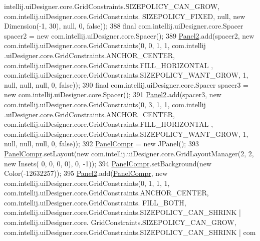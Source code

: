 \begin{DoxyCode}
      intellij.uiDesigner.core.GridConstraints.SIZEPOLICY\_CAN\_GROW, com.intellij.uiDesigner.core.GridConstraints.
      SIZEPOLICY\_FIXED, null, \textcolor{keyword}{new} Dimension(-1, 30), null, 0, \textcolor{keyword}{false}));
388         \textcolor{keyword}{final} com.intellij.uiDesigner.core.Spacer spacer2 = \textcolor{keyword}{new} com.intellij.uiDesigner.core.Spacer();
389         \hyperlink{classpresentacion_1_1form_1_1mainForm_a40e87b5e341114287b070012a4aadc8f}{Panel2}.add(spacer2, \textcolor{keyword}{new} com.intellij.uiDesigner.core.GridConstraints(0, 0, 1, 1, com.intellij
      .uiDesigner.core.GridConstraints.ANCHOR\_CENTER, com.intellij.uiDesigner.core.GridConstraints.FILL\_HORIZONTAL
      , com.intellij.uiDesigner.core.GridConstraints.SIZEPOLICY\_WANT\_GROW, 1, null, null, null, 0, \textcolor{keyword}{false}));
390         \textcolor{keyword}{final} com.intellij.uiDesigner.core.Spacer spacer3 = \textcolor{keyword}{new} com.intellij.uiDesigner.core.Spacer();
391         \hyperlink{classpresentacion_1_1form_1_1mainForm_a40e87b5e341114287b070012a4aadc8f}{Panel2}.add(spacer3, \textcolor{keyword}{new} com.intellij.uiDesigner.core.GridConstraints(0, 3, 1, 1, com.intellij
      .uiDesigner.core.GridConstraints.ANCHOR\_CENTER, com.intellij.uiDesigner.core.GridConstraints.FILL\_HORIZONTAL
      , com.intellij.uiDesigner.core.GridConstraints.SIZEPOLICY\_WANT\_GROW, 1, null, null, null, 0, \textcolor{keyword}{false}));
392         \hyperlink{classpresentacion_1_1form_1_1mainForm_a2d0f3d20d2a80c16321aaccbc273279d}{PanelCompr} = \textcolor{keyword}{new} JPanel();
393         \hyperlink{classpresentacion_1_1form_1_1mainForm_a2d0f3d20d2a80c16321aaccbc273279d}{PanelCompr}.setLayout(\textcolor{keyword}{new} com.intellij.uiDesigner.core.GridLayoutManager(2, 2, \textcolor{keyword}{new} Insets(
      0, 0, 0, 0), 0, -1));
394         \hyperlink{classpresentacion_1_1form_1_1mainForm_a2d0f3d20d2a80c16321aaccbc273279d}{PanelCompr}.setBackground(\textcolor{keyword}{new} Color(-12632257));
395         \hyperlink{classpresentacion_1_1form_1_1mainForm_a40e87b5e341114287b070012a4aadc8f}{Panel2}.add(\hyperlink{classpresentacion_1_1form_1_1mainForm_a2d0f3d20d2a80c16321aaccbc273279d}{PanelCompr}, \textcolor{keyword}{new} com.intellij.uiDesigner.core.GridConstraints(0, 1, 1, 1,
       com.intellij.uiDesigner.core.GridConstraints.ANCHOR\_CENTER, com.intellij.uiDesigner.core.GridConstraints.
      FILL\_BOTH, com.intellij.uiDesigner.core.GridConstraints.SIZEPOLICY\_CAN\_SHRINK | com.intellij.uiDesigner.core.
      GridConstraints.SIZEPOLICY\_CAN\_GROW, com.intellij.uiDesigner.core.GridConstraints.SIZEPOLICY\_CAN\_SHRINK | com

\end{DoxyCode}
